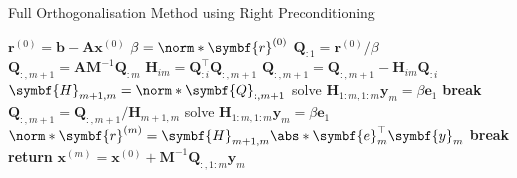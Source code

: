 \documentclass{article}
\begin{document}
\begin{algorithm}[H]
    \caption{Full Orthogonalisation Method using Right Preconditioning}
    \begin{algorithmic}
        \State \(\symbf{r}^{\left( 0 \right)} = \symbf{b} - \symbf{A} \symbf{x}^{\left( 0 \right)}\)
        \State \(\beta = \norm*{\symbf{r}^{\left( 0 \right)}}\)
        \State \(\symbf{Q}_{:1} = \symbf{r}^{\left( 0 \right)}/\beta\)
        \State \(\symbf{Q}_{:,m+1} = \symbf{A} \symbf{M}^{-1} \symbf{Q}_{:m}\) 
        \State \(\symbf{H}_{im} = \symbf{Q}_{:i}^\top \symbf{Q}_{:,m + 1}\)
        \State \(\symbf{Q}_{:,m+1} = \symbf{Q}_{:,m+1} - \symbf{H}_{im} \symbf{Q}_{:i}\)
        \EndFor
        \State \(\symbf{H}_{m+1,m} = \norm*{\symbf{Q}_{:,m+1}}\)
        \Statex
        \State solve \(\symbf{H}_{1:m,1:m} \symbf{y}_m = \beta \symbf{e}_1\)
        \State \textbf{break}
        \EndIf
        \State \(\symbf{Q}_{:,m+1} = \symbf{Q}_{:,m+1} / \symbf{H}_{m+1,m}\)
        \Statex
        \State solve \(\symbf{H}_{1:m,1:m} \symbf{y}_m = \beta \symbf{e}_1\)
        \State \(\norm*{\symbf{r}^{\left( m \right)}} = \symbf{H}_{m+1,m} \abs*{\symbf{e}_m^\top \symbf{y}_m}\)
        \State \textbf{break}
        \EndIf
        \EndFor
        \State \textbf{return} \(\symbf{x}^{\left( m \right)} = \symbf{x}^{\left( 0 \right)} + \symbf{M}^{-1} \symbf{Q}_{:,1:m} \symbf{y}_m\) 
    \end{algorithmic}
\end{algorithm}
\end{document}
